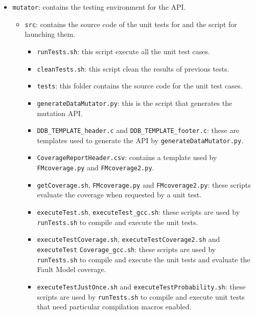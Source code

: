 \begin{itemize}
{\begin{itemize}
\begin{itemize}
\begin{itemize}
			\item \texttt{test\_files}: this folder contains the necessary files for executing the test cases.
		\end{itemize}
	\end{itemize}%
	\item \texttt{mutator}: contains the testing environment for the \DAMA API.
	\begin{itemize}%
		\item \texttt{src}: contains the source code of the unit tests for \DAMA and the script for launching them.
		\begin{itemize}%
			\item \texttt{runTests.sh}: this script execute all the unit test cases.
			\item \texttt{cleanTests.sh}: this script clean the results of previous tests.
			\item \texttt{tests}: this folder contains the source code for the unit test cases.
			\item \texttt{generateDataMutator.py}: this is the script that generates the \DAMA mutation API.
			\item \texttt{DDB\_TEMPLATE\_header.c} and \texttt{DDB\_TEMPLATE\_footer.c}: these are templates used to generate the \DAMA API by \texttt{generateDataMutator.py}.
			\item \texttt{CoverageReportHeader.csv}: contains a template used by \texttt{FMcoverage.py} and \texttt{FMcoverage2.py}.
			\item \texttt{getCoverage.sh}, \texttt{FMcoverage.py} and \texttt{FMcoverage2.py}: these scripts evaluate the coverage when requested by a unit test.
			\item \texttt{executeTest.sh}, \texttt{executeTest\_gcc.sh}: these scripts are used by \texttt{runTests.sh} to compile and execute the unit tests.
			\item \texttt{executeTestCoverage.sh}, \texttt{executeTestCoverage2.sh} and  \texttt{execute}\texttt{Test}
			\texttt{Coverage}\texttt{\_gcc.sh}: these scripts are used by \texttt{runTests.sh} to compile and execute the unit tests and evaluate the Fault Model coverage.
			\item \texttt{executeTestJustOnce.sh} and \texttt{executeTestProbability.sh}: these scripts are used by \texttt{runTests.sh} to compile and execute unit tests that need particular compilation macros enabled.
		\end{itemize}%
	\end{itemize}%
\end{itemize}%
}



\end{itemize}
